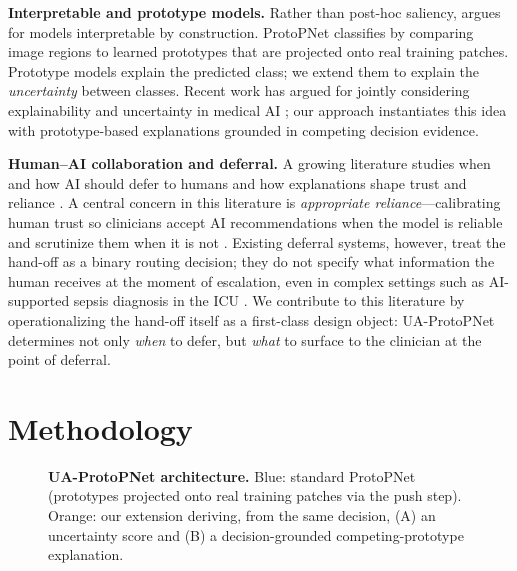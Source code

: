 \documentclass[10pt]{article}
\newcommand{\method}{UA-ProtoPNet}
\begin{document}
\textbf{Interpretable and prototype models.} Rather than post-hoc saliency,
\textcite{rudin2019stop} argues for models interpretable by construction.
ProtoPNet \parencite{chen2019protopnet} classifies by comparing image regions to
learned prototypes that are projected onto real training patches. Prototype models explain the predicted class; we extend them to explain the
\emph{uncertainty} between classes. Recent work has argued for jointly
considering explainability and uncertainty in medical AI
\parencite{Salvi2025uncertainty}; our approach instantiates this idea
with prototype-based explanations grounded in competing decision evidence.

\textbf{Human--AI collaboration and deferral.} A growing literature studies when and how AI should defer to humans
\parencite{mozannar2020consistent} and how explanations shape trust and reliance
\parencite{ghassemi2021false}. A central concern in this literature is
\emph{appropriate reliance}---calibrating human trust so clinicians accept
AI recommendations when the model is reliable and scrutinize them when it is
not \parencite{ghassemi2021false,mozannar2020consistent}. Existing deferral systems, however, treat the hand-off as a binary routing
decision; they do not specify what information the human receives at the moment
of escalation, even in complex settings such as AI-supported sepsis diagnosis in
the ICU \parencite{Zhang2024rethinking}. We contribute to this literature by
operationalizing the hand-off itself as a first-class design object:
\method{} determines not only \emph{when} to defer, but \emph{what} to surface
to the clinician at the point of deferral.


\section{Methodology}
\label{sec:method}

%   

\begin{figure}[!htbp]\centering
    \resizebox{\textwidth}{!}{%
      
    }%
  \caption{\textbf{\method{} architecture.} Blue: standard ProtoPNet
  (prototypes projected onto real training patches via the push step). Orange:
  our extension deriving, from the same decision, (A) an uncertainty score and
  (B) a decision-grounded competing-prototype explanation.}
  \label{fig:arch}
\end{figure}
\end{document}
